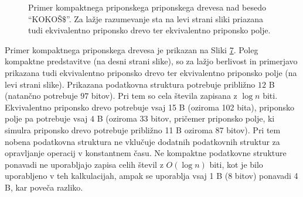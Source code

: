 \begin{figure}[htb]
    \begin{subfigure}[t]{0.4\linewidth}
        
        \begin{subfigure}[t]{1\linewidth}        
            
            \centering
            \subcaption*{}
            \label{fig:neKompaktnoDrevo}
        \end{subfigure}
        \begin{subfigure}[t]{1\linewidth}        
            
            \centering
            \subcaption*{}
            \label{fig:KompaktnoPolje}
        \end{subfigure}
        \centering
        \subcaption*{}
        \label{fig:neKompaktno}
    \end{subfigure}
    \begin{subfigure}[t]{0.6\linewidth}        
        \begin{subfigure}[t]{1\linewidth}  
            \hspace{0.25cm}      
            
            \subcaption*{}
            \label{fig:neKompaktnoDrevo}
        \end{subfigure}
        \begin{subfigure}[t]{1\linewidth}        
            
            \centering
            \subcaption*{}
            \label{fig:KompaktnoPolje}
        \end{subfigure}
        \subcaption*{}
        \label{fig:Kompaktno}
    \end{subfigure}
    \caption{Primer kompaktnega priponskega priponskega drevesa nad besedo \enquote{KOKOŠ$\$$}. Za lažje razumevanje sta na levi strani sliki priazana tudi ekvivalentno priponsko drevo ter ekvivalentno priponsko polje.} 
    \label{fig:CST}
\end{figure}

Primer kompaktnega priponskega drevesa je prikazan na Sliki \ref{fig:CST}. Poleg kompaktne predstavitve (na desni strani slike), so za lažjo berlivost in primerjavo prikazana tudi ekvivalentno priponsko drevo ter ekvivalentno priponsko polje (na levi strani slike). Prikazana podatkovna struktura potrebuje približno $12$ B (natančno potrebuje $97$ bitov). Pri tem so cela števila zapisana z $\log{n}$ biti. Ekvivalentno priponsko drevo potrebuje vsaj 15 B (oziroma 102 bita), priponsko polje pa potrebuje vsaj $4$ B (oziroma 33 bitov, pričemer priponsko polje, ki simulra priponsko drevo potrebuje približno 11 B oziroma 87 bitov). Pri tem nobena podatkovna struktura ne vklučuje dodatnih podatkovnih struktur za opravljanje operacij v konstantnem času. Ne kompaktne podatkovne strukture ponavadi ne uporabljajo zapisa celih števil z $O(\log{n})$ biti, kot je bilo uporabljeno v teh kalkulacijah, ampak se uporablja vsaj 1 B (8 bitov) ponavadi 4 B, kar poveča razliko.


